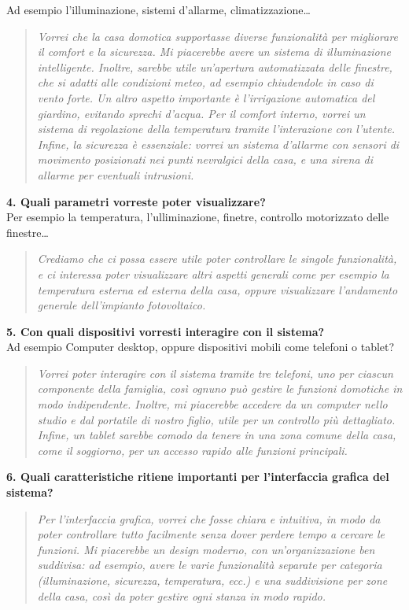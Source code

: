 \documentclass{exam}
\begin{document}
Ad esempio l'illuminazione, sistemi d'allarme, climatizzazione\ldots\\[1.5mm]
\begin{quote}
\emph{Vorrei che la casa domotica supportasse diverse funzionalità per migliorare il comfort e la sicurezza. Mi piacerebbe avere un sistema di illuminazione intelligente. Inoltre, sarebbe utile un’apertura automatizzata delle finestre, che si adatti alle condizioni meteo, ad esempio chiudendole in caso di vento forte.
Un altro aspetto importante è l’irrigazione automatica del giardino, evitando sprechi d’acqua. Per il comfort interno, vorrei un sistema di regolazione della temperatura tramite l'interazione con l'utente. Infine, la sicurezza è essenziale: vorrei un sistema d’allarme con sensori di movimento posizionati nei punti nevralgici della casa, e una sirena di allarme per eventuali intrusioni.}\\
\end{quote}

\clearpage
\noindent\textbf{4. Quali parametri vorreste poter visualizzare?}\\[1.5mm]
Per esempio la temperatura, l'ulliminazione, finetre, controllo motorizzato delle finestre\ldots
\begin{quote}
    \emph{Crediamo che ci possa essere utile poter controllare le singole funzionalità, e ci interessa poter visualizzare altri aspetti generali come per esempio la temperatura esterna ed esterna della casa, oppure visualizzare l'andamento generale dell'impianto fotovoltaico.}
\end{quote}
\clearpage
\noindent\textbf{5. Con quali dispositivi vorresti interagire con il sistema?}\\[1mm]
Ad esempio Computer desktop, oppure dispositivi mobili come telefoni o tablet?\\[1.5mm]
\begin{quote}
\emph{Vorrei poter interagire con il sistema tramite tre telefoni, uno per ciascun componente della famiglia, così ognuno può gestire le funzioni domotiche in modo indipendente. Inoltre, mi piacerebbe accedere da un computer nello studio e dal portatile di nostro figlio, utile per un controllo più dettagliato. Infine, un tablet sarebbe comodo da tenere in una zona comune della casa, come il soggiorno, per un accesso rapido alle funzioni principali.}\\
\end{quote}
\clearpage
\noindent\textbf{6. Quali caratteristiche ritiene importanti per l’interfaccia grafica del sistema?}\\[1.5mm]
\begin{quote}
\emph{Per l’interfaccia grafica, vorrei che fosse chiara e intuitiva, in modo da poter controllare tutto facilmente senza dover perdere tempo a cercare le funzioni. Mi piacerebbe un design moderno, con un’organizzazione ben suddivisa: ad esempio, avere le varie funzionalità separate per categoria (illuminazione, sicurezza, temperatura, ecc.) e una suddivisione per zone della casa, così da poter gestire ogni stanza in modo rapido.}
\end{quote}
\end{document}
